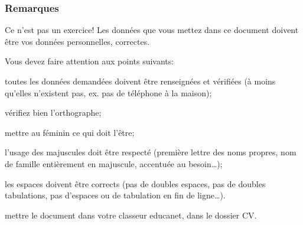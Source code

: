 \documentclass[frenchb]{scrartcl}
\begin{document}
\begin{multicols}{2}
\subsubsection*{Remarques}
Ce n'est pas un exercice!
Les données que vous mettez dans ce document doivent être vos données personnelles, correctes.

Vous devez faire attention aux points suivants:
\begin{compactenum}
	\item toutes les données demandées doivent être renseignées et vérifiées
		(à moins qu'elles n'existent pas, ex. pas de téléphone à la maison);
	\item vérifiez bien l'orthographe;
	\item mettre au féminin ce qui doit l'être;
	\item l'usage des majuscules doit être respecté (première lettre des noms propres, nom de famille entièrement en majuscule, accentuée au besoin\dots);
	\item les espaces doivent être corrects (pas de doubles espaces, pas de doubles tabulations, pas d'espaces ou de tabulation en fin de ligne\dots).
	\item mettre le document dans votre classeur educanet, dans le dossier CV.
\end{compactenum}

\end{multicols}
\end{document}
